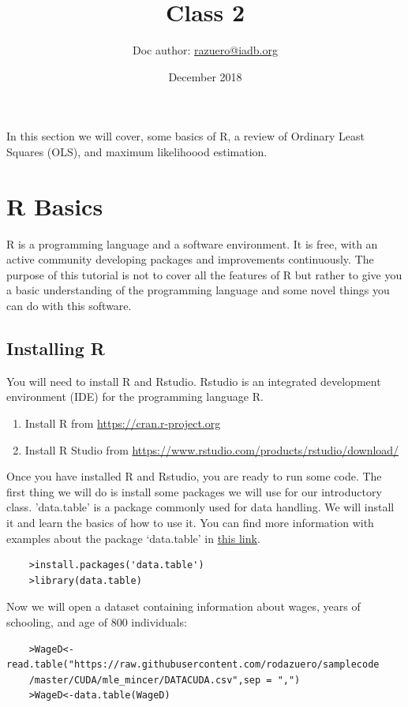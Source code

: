 \documentclass[11pt,letterpaper]{article}
\title{Class 2}
\author{Doc author: \href{mailto:razuero@iadb.org}{razuero@iadb.org}}
\date{December 2018}
\begin{document}
\maketitle
In this section we will cover, some basics of R, a review of Ordinary Least Squares (OLS), and maximum likelihoood estimation.



\section{R Basics}
R is a programming language and a software environment. It is free, with an active community developing packages and improvements continuously. The purpose of this tutorial is not to cover all the features of R but rather to give you a basic understanding of the programming language and some novel things you can do with this software. 
\subsection{Installing R}
You will need to install R and Rstudio. Rstudio is an integrated development environment (IDE) for the programming language R. 
\begin{enumerate}
    \item Install R from \href{https://cran.r-project.org/}{https://cran.r-project.org}
    \item Install R Studio from \href{https://www.rstudio.com/products/rstudio/download/}{https://www.rstudio.com/products/rstudio/download/}
\end{enumerate}
Once you have installed R and Rstudio, you are ready to run some code. The first thing we will do is install some packages we will use for our introductory class. 'data.table' is a package commonly used for data handling. We will install it and learn the basics of how to use it. You can find more information with examples about the package `data.table' in \href{https://cran.r-project.org/web/packages/data.table/vignettes/datatable-intro.html}{this link}.

\begin{verbatim}
    >install.packages('data.table')
    >library(data.table)
\end{verbatim}

Now we will open a dataset containing information about wages, years of schooling, and age of 800 individuals:
\begin{verbatim}
    >WageD<-read.table("https://raw.githubusercontent.com/rodazuero/samplecode
    /master/CUDA/mle_mincer/DATACUDA.csv",sep = ",")
    >WageD<-data.table(WageD)
\end{verbatim}
\end{document}
